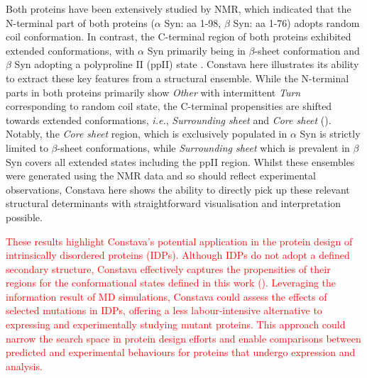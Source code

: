 Both proteins have been extensively studied by NMR, which indicated that the N-terminal part of both proteins ($\alpha$ Syn: aa 1-98, $\beta$ Syn: aa 1-76) adopts random coil conformation. In contrast, the C-terminal region of both proteins exhibited extended conformations, with $\alpha$ Syn primarily being in $\beta$-sheet conformation \cite{allison_relationship_2014} and $\beta$ Syn adopting a polyproline II (ppII) state \cite{bertoncini_structural_2007}. Constava here illustrates its ability to extract these key features from a structural ensemble. While the N-terminal parts in both proteins primarily show \textit{Other} with intermittent \textit{Turn} corresponding to random coil state, the C-terminal propensities are shifted towards extended conformations, \textit{i.e.}, \textit{Surrounding sheet} and \textit{Core sheet} (). Notably, the \textit{Core sheet} region, which is exclusively populated in $\alpha$ Syn is  strictly limited to $\beta$-sheet conformations, while \textit{Surrounding sheet} which is prevalent in $\beta$ Syn covers all extended states including the ppII region. Whilst these ensembles were generated using the NMR data and so should reflect experimental observations, Constava here shows the ability to directly pick up these relevant structural determinants with straightforward visualisation and interpretation possible.

\textcolor{red}{These results highlight Constava's potential application in the protein design of intrinsically disordered proteins (IDPs). Although IDPs do not adopt a defined secondary structure, Constava effectively captures the propensities of their regions for the conformational states defined in this work (). Leveraging the information result of MD simulations, Constava could assess the effects of selected mutations in IDPs, offering a less labour-intensive alternative to expressing and experimentally studying mutant proteins. This approach could narrow the search space in protein design efforts and enable comparisons between predicted and experimental behaviours for proteins that undergo expression and analysis.}

